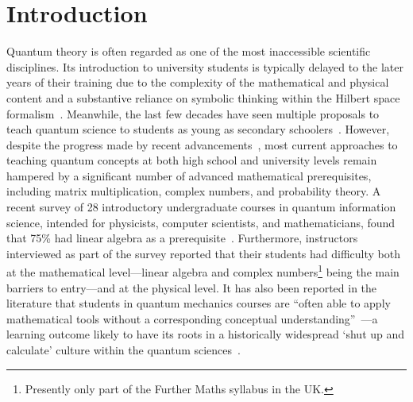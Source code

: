 \section{Introduction}

Quantum theory is often regarded as one of the most inaccessible scientific disciplines.
Its introduction to university students is typically delayed to the later years of their training due to the complexity of the mathematical and physical content and a substantive reliance on symbolic thinking within the Hilbert space formalism~\cite{Marshman2016difficultqoperators}.
Meanwhile, the last few decades have seen multiple proposals to teach quantum science to students as young as secondary schoolers~\cite{stadermann2019analysis, michelini2000proposal, bitzenbauer2020new, escalada2004student}. However, despite the progress made by recent advancements~\cite{economou2022hello, walsh2021piloting, perry2019quantum, hughes2022teaching, davis2022quantum}, most current approaches to teaching quantum concepts at both high school and university levels remain hampered by a significant number of advanced mathematical prerequisites, including matrix multiplication, complex numbers, and probability theory. 
A recent survey of 28 introductory undergraduate courses in quantum information science, intended for physicists, computer scientists, and mathematicians, found that 75\% had linear algebra as a prerequisite~\cite{meyer2022interdisciplinary}.
Furthermore, instructors interviewed as part of the survey reported that their students had difficulty both at the mathematical level---linear algebra and complex numbers\footnote{Presently only part of the Further Maths syllabus in the UK.\newline \newline } being the main barriers to entry---and at the physical level.
It has also been reported in the literature that students in quantum mechanics courses are ``often able to apply mathematical tools without a corresponding conceptual understanding''~\cite{baily2010teaching}---a learning outcome likely to have its roots in a historically widespread `shut up and calculate' culture within the quantum sciences~\cite{johansson2018shut,kaiser2014shut}.

